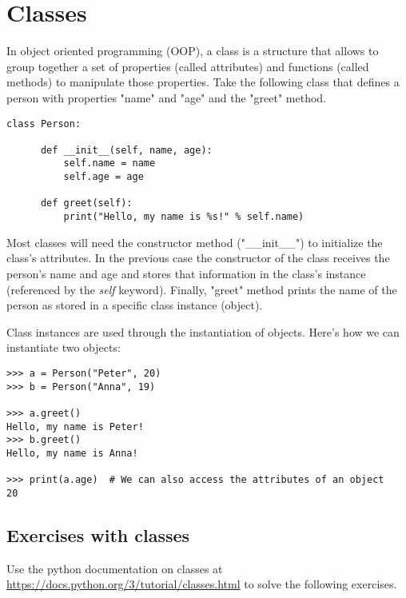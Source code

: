\chapter{Classes}\label{classes}

In object oriented programming (OOP), a class is a structure that allows to group together a set of properties (called attributes) and functions (called methods) to manipulate those properties. Take the following class that defines a person with properties "name" and "age" and the "greet" method.

\begin{lstlisting}
class Person:

      def __init__(self, name, age):
          self.name = name
          self.age = age
          
      def greet(self):
          print("Hello, my name is %s!" % self.name)
\end{lstlisting}

Most classes will need the constructor method ("\_\_init\_\_") to initialize the class's attributes. In the previous case the constructor of the class receives the person's name and age and stores that information in the class's instance (referenced by the \textit{self} keyword). Finally, "greet" method prints the name of the person as stored in a specific class instance (object).

Class instances are used through the instantiation of objects. Here's how we can instantiate two objects:

\begin{lstlisting}
>>> a = Person("Peter", 20)
>>> b = Person("Anna", 19)

>>> a.greet()
Hello, my name is Peter!
>>> b.greet()
Hello, my name is Anna!
  
>>> print(a.age)  # We can also access the attributes of an object
20
\end{lstlisting}

\section{Exercises with classes}

Use the python documentation on classes at \url{https://docs.python.org/3/tutorial/classes.html} to solve the following exercises.

